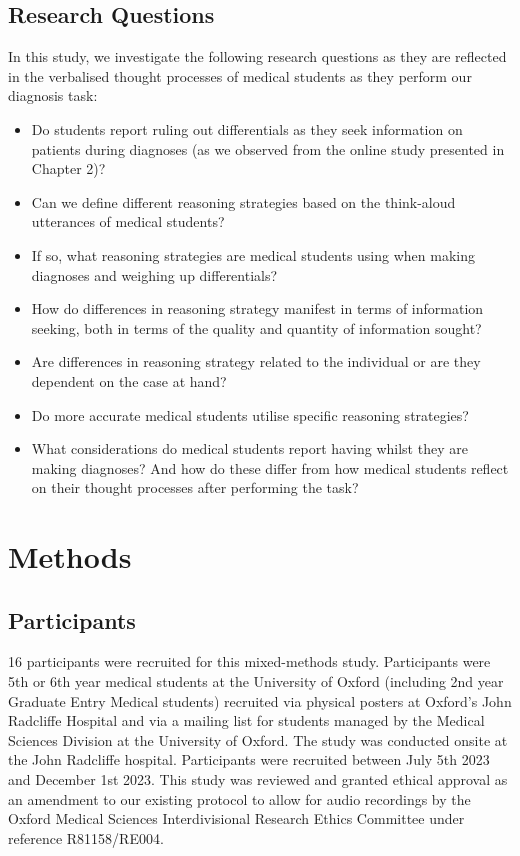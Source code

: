 \documentclass[a4paper, nobind]{templates/ociamthesis}
\providecommand{\tightlist}{%
  \setlength{\itemsep}{0pt}\setlength{\parskip}{0pt}}
\begin{document}
\subsection{Research Questions}\label{research-questions-1}

In this study, we investigate the following research questions as they are reflected in the verbalised thought processes of medical students as they perform our diagnosis task:

\begin{itemize}
\tightlist
\item
  Do students report ruling out differentials as they seek information on patients during diagnoses (as we observed from the online study presented in Chapter 2)?
\item
  Can we define different reasoning strategies based on the think-aloud utterances of medical students?
\item
  If so, what reasoning strategies are medical students using when making diagnoses and weighing up differentials?
\item
  How do differences in reasoning strategy manifest in terms of information seeking, both in terms of the quality and quantity of information sought?
\item
  Are differences in reasoning strategy related to the individual or are they dependent on the case at hand?
\item
  Do more accurate medical students utilise specific reasoning strategies?
\item
  What considerations do medical students report having whilst they are making diagnoses? And how do these differ from how medical students reflect on their thought processes after performing the task?
\end{itemize}

\section{Methods}\label{methods-2}

\subsection{Participants}\label{participants-1}

16 participants were recruited for this mixed-methods study. Participants were 5th or 6th year medical students at the University of Oxford (including 2nd year Graduate Entry Medical students) recruited via physical posters at Oxford's John Radcliffe Hospital and via a mailing list for students managed by the Medical Sciences Division at the University of Oxford. The study was conducted onsite at the John Radcliffe hospital. Participants were recruited between July 5th 2023 and December 1st 2023. This study was reviewed and granted ethical approval as an amendment to our existing protocol to allow for audio recordings by the Oxford Medical Sciences Interdivisional Research Ethics Committee under reference R81158/RE004.
\end{document}
